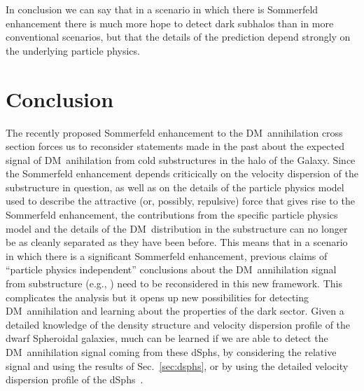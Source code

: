 \documentclass[aps,prd,twocolumn,amsmath,amssymb,floatfix,nofootinbib,10pt]{revtex4}
\newcommand{\eg}{e.g.}
\newcommand{\DM}{DM}
\newcommand{\dSphs}{dSphs}
\begin{document}
In conclusion we can say that in a scenario in which there is
Sommerfeld enhancement there is much more hope to detect dark subhalos
than in more conventional scenarios, but that the details of the
prediction depend strongly on the underlying particle physics.

\section{Conclusion}

The recently proposed Sommerfeld enhancement to the \DM\ annihilation
cross section forces us to reconsider statements made in the past
about the expected signal of \DM\ anihilation from cold substructures
in the halo of the Galaxy. Since the Sommerfeld enhancement depends
criticically on the velocity dispersion of the substructure in
question, as well as on the details of the particle physics model used
to describe the attractive (or, possibly, repulsive) force that gives
rise to the Sommerfeld enhancement, the contributions from the
specific particle physics model and the details of the \DM\
distribution in the substructure can no longer be as cleanly separated
as they have been before. This means that in a scenario in which there
is a significant Sommerfeld enhancement, previous claims of ``particle
physics independent'' conclusions about the \DM\ annihilation signal
from substructure (\eg,
\cite{2007PhRvD..75h3526S,2008Natur.456...73S}) need to be
reconsidered in this new framework. This complicates the analysis but
it opens up new possibilities for detecting \DM\ annihilation and
learning about the properties of the dark sector. Given a detailed
knowledge of the density structure and velocity dispersion profile of
the dwarf Spheroidal galaxies, much can be learned if we are able to
detect the \DM\ annihilation signal coming from these \dSphs, by
considering the relative signal and using the results of
Sec.~\ref{sec:dsphs}, or by using the detailed velocity dispersion
profile of the \dSphs\ \cite{2009arXiv0902.0362R}.
\end{document}
